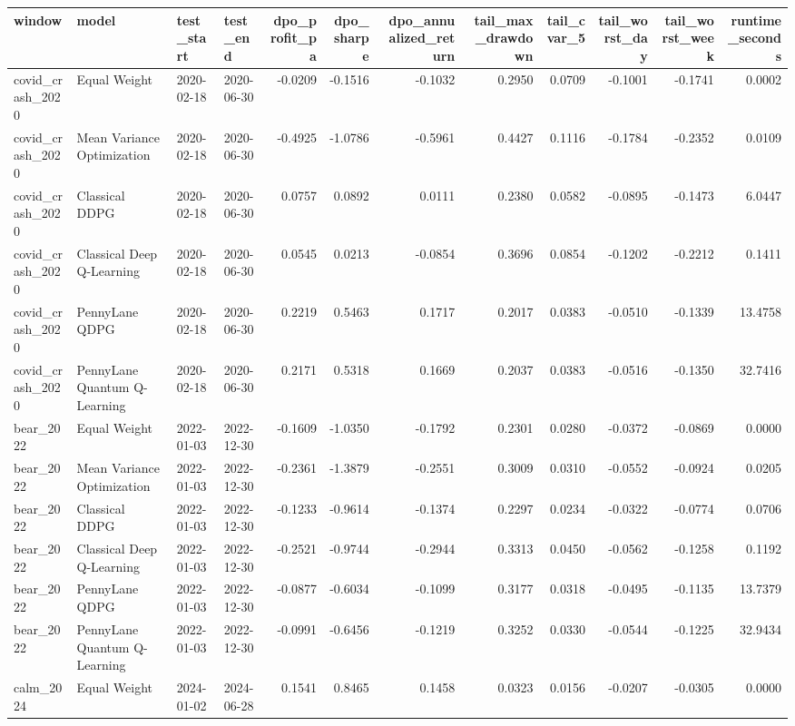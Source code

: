 \begin{tabular}{llllrrrrrrrr}
\toprule
window & model & test_start & test_end & dpo_profit_pa & dpo_sharpe & dpo_annualized_return & tail_max_drawdown & tail_cvar_5 & tail_worst_day & tail_worst_week & runtime_seconds \\
\midrule
covid_crash_2020 & Equal Weight & 2020-02-18 & 2020-06-30 & -0.0209 & -0.1516 & -0.1032 & 0.2950 & 0.0709 & -0.1001 & -0.1741 & 0.0002 \\
covid_crash_2020 & Mean Variance Optimization & 2020-02-18 & 2020-06-30 & -0.4925 & -1.0786 & -0.5961 & 0.4427 & 0.1116 & -0.1784 & -0.2352 & 0.0109 \\
covid_crash_2020 & Classical DDPG & 2020-02-18 & 2020-06-30 & 0.0757 & 0.0892 & 0.0111 & 0.2380 & 0.0582 & -0.0895 & -0.1473 & 6.0447 \\
covid_crash_2020 & Classical Deep Q-Learning & 2020-02-18 & 2020-06-30 & 0.0545 & 0.0213 & -0.0854 & 0.3696 & 0.0854 & -0.1202 & -0.2212 & 0.1411 \\
covid_crash_2020 & PennyLane QDPG & 2020-02-18 & 2020-06-30 & 0.2219 & 0.5463 & 0.1717 & 0.2017 & 0.0383 & -0.0510 & -0.1339 & 13.4758 \\
covid_crash_2020 & PennyLane Quantum Q-Learning & 2020-02-18 & 2020-06-30 & 0.2171 & 0.5318 & 0.1669 & 0.2037 & 0.0383 & -0.0516 & -0.1350 & 32.7416 \\
bear_2022 & Equal Weight & 2022-01-03 & 2022-12-30 & -0.1609 & -1.0350 & -0.1792 & 0.2301 & 0.0280 & -0.0372 & -0.0869 & 0.0000 \\
bear_2022 & Mean Variance Optimization & 2022-01-03 & 2022-12-30 & -0.2361 & -1.3879 & -0.2551 & 0.3009 & 0.0310 & -0.0552 & -0.0924 & 0.0205 \\
bear_2022 & Classical DDPG & 2022-01-03 & 2022-12-30 & -0.1233 & -0.9614 & -0.1374 & 0.2297 & 0.0234 & -0.0322 & -0.0774 & 0.0706 \\
bear_2022 & Classical Deep Q-Learning & 2022-01-03 & 2022-12-30 & -0.2521 & -0.9744 & -0.2944 & 0.3313 & 0.0450 & -0.0562 & -0.1258 & 0.1192 \\
bear_2022 & PennyLane QDPG & 2022-01-03 & 2022-12-30 & -0.0877 & -0.6034 & -0.1099 & 0.3177 & 0.0318 & -0.0495 & -0.1135 & 13.7379 \\
bear_2022 & PennyLane Quantum Q-Learning & 2022-01-03 & 2022-12-30 & -0.0991 & -0.6456 & -0.1219 & 0.3252 & 0.0330 & -0.0544 & -0.1225 & 32.9434 \\
calm_2024 & Equal Weight & 2024-01-02 & 2024-06-28 & 0.1541 & 0.8465 & 0.1458 & 0.0323 & 0.0156 & -0.0207 & -0.0305 & 0.0000 \\

\end{tabular}
